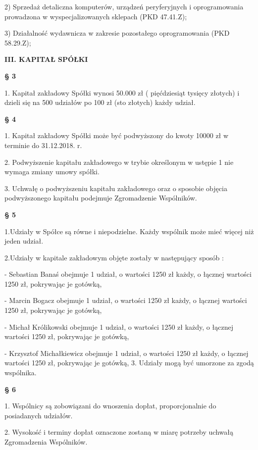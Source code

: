 2) Sprzedaż detaliczna komputerów, urządzeń peryferyjnych i oprogramowania prowadzona w wyspecjalizowanych sklepach (PKD 47.41.Z);

3) Działalność wydawnicza w zakresie pozostałego oprogramowania (PKD 58.29.Z);
\\

\centerline{\large\textbf{III. KAPITAŁ SPÓŁKI}}

\centerline{\large\textbf{§ 3}}

1. Kapitał zakładowy Spółki wynosi 50.000 zł ( pięćdziesiąt tysięcy złotych) i dzieli się na  500 udziałów po 100 zł (sto złotych) każdy udział.\\

\centerline{\large\textbf{§ 4}}

1. Kapitał zakładowy Spółki może być podwyższony do kwoty 10000 zł w terminie do 31.12.2018. r.

2. Podwyższenie kapitału zakładowego w trybie określonym w ustępie 1 nie wymaga zmiany umowy spółki.

3. Uchwałę o podwyższeniu kapitału zakładowego oraz o sposobie objęcia podwyższonego kapitału podejmuje Zgromadzenie Wspólników.\\

\centerline{\large\textbf{§ 5}}

1.Udziały w Spółce są równe i niepodzielne. Każdy wspólnik może mieć więcej niż jeden udział.

2.Udziały w kapitale zakładowym objęte zostały w następujący sposób :

- Sebastian Banaś obejmuje 1 udział,  o wartości 1250 zł każdy, o łącznej wartości 1250 zł, pokrywając je gotówką,

- Marcin Bogacz obejmuje 1 udział,  o wartości 1250 zł każdy, o łącznej wartości 1250 zł, pokrywając je gotówką,

- Michał Królikowski obejmuje 1 udział,  o wartości 1250 zł każdy, o łącznej wartości 1250 zł, pokrywając je gotówką,

- Krzysztof Michałkiewicz obejmuje 1 udział,  o wartości 1250 zł każdy, o łącznej wartości 1250 zł, pokrywając je gotówką,
3. Udziały mogą być umorzone za zgodą wspólnika.\\

\centerline{\large\textbf{§ 6}}

1.      Wspólnicy są zobowiązani do wnoszenia dopłat, proporcjonalnie do posiadanych udziałów.

2.      Wysokość i terminy dopłat oznaczone zostaną w miarę potrzeby uchwałą Zgromadzenia Wspólników.

